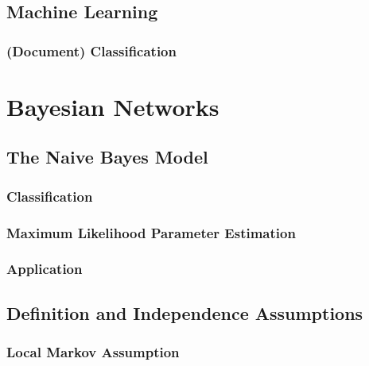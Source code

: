     \section{Machine Learning} %

        \subsection{(Document) Classification} %

\chapter{Bayesian Networks} %

    \section{The Naive Bayes Model} %

        \subsection{Classification} %

        \subsection{Maximum Likelihood Parameter Estimation} %

        \subsection{Application} %

    \section{Definition and Independence Assumptions} %

        \subsection{Local Markov Assumption} %

